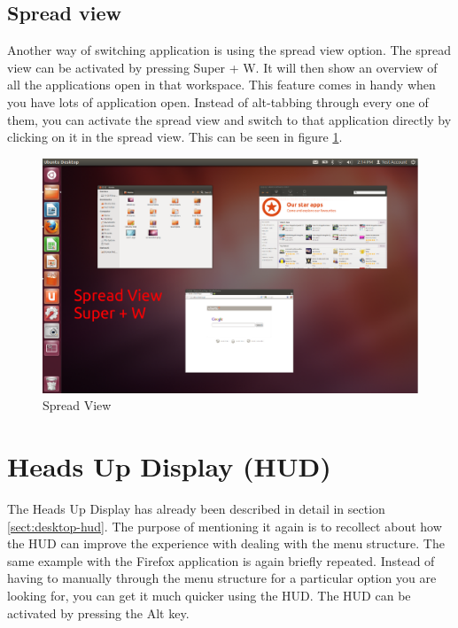 \subsection*{Spread view} 
Another way of switching application is using the spread view option. The spread view can be activated by pressing Super + W. It will then show an overview of all the applications open in that workspace. This feature comes in handy when you have lots of application open. Instead of alt-tabbing through every one of them, you can activate the spread view and switch to that application directly by clicking on it in the spread view. This can be seen in figure \ref{fig:spread-view}. \\

\begin{figure}[ht!]	
	\centering
	\includegraphics[width=325pt]{./images/work-ubuntu/spread-view.png}
	\caption{Spread View}	
	\label{fig:spread-view}		
\end{figure}

\section{Heads Up Display (HUD)}
The Heads Up Display has already been described in detail in section \ref{sect:desktop-hud}. The purpose of mentioning it again is to recollect about how the HUD can improve the experience with dealing with the menu structure. The same example with the Firefox application is again briefly repeated. Instead of having to manually through the menu structure for a particular option you are looking for, you can get it much quicker using the HUD. The HUD can be activated by pressing the Alt key. 

